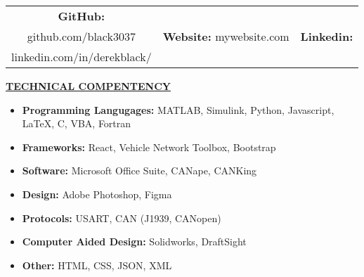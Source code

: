 \documentclass[8pt,letterpaper,oneside]{article}
\newcommand{\longunderline}[1]{\uline{#1\hfill\mbox{}}}
\newcommand{\sectionhead}[1]{ \large \flushleft \longunderline{\textbf{#1}}} %
\begin{document}
    \begin{center}
        \begin{tabular}{ c c c }
            \textbf{GitHub:} \href{https:\\github.com/black3037}{github.com/black3037} & \textbf{Website:} mywebsite.com & \textbf{Linkedin:} \href{https:\\linkedin.com/in/derekblack/}{linkedin.com/in/derekblack/}
        \end{tabular}
    \end{center}

    \sectionhead{TECHNICAL COMPENTENCY}
        \begin{sectionitems}
            \begin{itemize}
                \setlength\itemsep{0.1em}
                \setlength{\itemindent}{-0.4em}
                \item \textbf{Programming Langugages:} MATLAB, Simulink, Python, Javascript, \LaTeX, C, VBA, Fortran
                \item \textbf{Frameworks:} React, Vehicle Network Toolbox, Bootstrap
                \item \textbf{Software:} Microsoft Office Suite, CANape, CANKing
                \item \textbf{Design:} Adobe Photoshop, Figma
                \item \textbf{Protocols:} USART, CAN (J1939, CANopen)
                \item \textbf{Computer Aided Design:} Solidworks, DraftSight
                \item \textbf{Other:} HTML, CSS, JSON, XML
            \end{itemize}
        \end{sectionitems}
\end{document}
